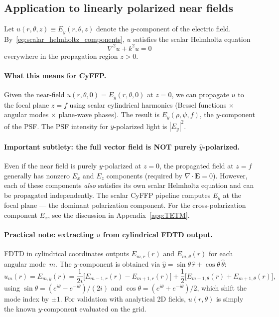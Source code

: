 \documentclass[11pt,a4paper]{article}
\newcommand{\rhat}{\hat{r}}
\newcommand{\that}{\hat{\theta}}
\newcommand{\yhat}{\hat{y}}
\newcommand{\E}{\mathbf{E}}
\begin{document}
\subsection{Application to linearly polarized near fields}
\label{sec:scalar_application}

Let $u(r,\theta,z) \equiv E_y(r,\theta,z)$ denote the $y$-component of the electric
field.  By~\eqref{eq:scalar_helmholtz_components}, $u$ satisfies the scalar Helmholtz
equation
\begin{equation}\label{eq:scalar_helmholtz}
  \nabla^2 u + k^2 u = 0
\end{equation}
everywhere in the propagation region $z > 0$.

\paragraph{What this means for CyFFP.}
Given the near-field $u(r,\theta,0) = E_y(r,\theta,0)$ at $z=0$, we can propagate $u$
to the focal plane $z = f$ using scalar cylindrical harmonics (Bessel functions $\times$
angular modes $\times$ plane-wave phases).  The result is $E_y(\rho,\psi,f)$, the
$y$-component of the PSF.  The PSF intensity for $y$-polarized light is $|E_y|^2$.

\paragraph{Important subtlety: the full vector field is NOT purely $\yhat$-polarized.}
Even if the near field is purely $y$-polarized at $z = 0$, the propagated field at
$z = f$ generally has nonzero $E_x$ and $E_z$ components (required by
$\nabla\cdot\E = 0$).  However, each of these components \emph{also} satisfies its
own scalar Helmholtz equation and can be propagated independently.  The scalar CyFFP
pipeline computes $E_y$ at the focal plane --- the dominant polarization component.
For the cross-polarization component $E_x$, see the discussion in
Appendix~\ref{app:TETM}.

\paragraph{Practical note: extracting $u$ from cylindrical FDTD output.}
FDTD in cylindrical coordinates outputs $E_{m,r}(r)$ and $E_{m,\theta}(r)$ for each
angular mode~$m$.  The $y$-component is obtained via
$\yhat = \sin\theta\,\rhat + \cos\theta\,\that$:
\begin{equation}\label{eq:uy_from_cyl}
  u_m(r) = E_{m,y}(r)
  = \frac{1}{2i}\bigl[E_{m-1,r}(r) - E_{m+1,r}(r)\bigr]
  + \frac{1}{2}\bigl[E_{m-1,\theta}(r) + E_{m+1,\theta}(r)\bigr],
\end{equation}
using $\sin\theta = (e^{i\theta}-e^{-i\theta})/(2i)$ and
$\cos\theta = (e^{i\theta}+e^{-i\theta})/2$, which shift the mode index by $\pm 1$.
For validation with analytical 2D fields, $u(r,\theta)$ is simply the known
$y$-component evaluated on the grid.
\end{document}
